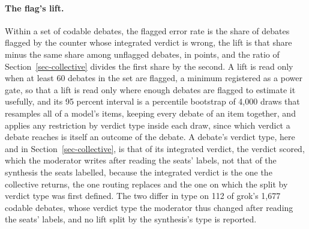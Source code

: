 \paragraph{The flag's lift.}
Within a set of codable debates, the flagged error rate is the share of
debates flagged by the counter whose integrated verdict is wrong, the lift is
that share minus the same share among unflagged debates, in points, and the
ratio of Section~\ref{sec-collective} divides the first share by the second.
A lift is read only when at least 60 debates in the set are flagged, a
minimum registered as a power gate, so that a lift is read only where enough
debates are flagged to estimate it usefully, and its 95 percent interval is a
percentile bootstrap of
4,000 draws that resamples all of a model's items, keeping every debate of an
item together, and applies any restriction by verdict type inside each draw,
since which verdict a debate reaches is itself an outcome of the debate.
A debate's verdict type, here and in Section~\ref{sec-collective}, is that of
its integrated verdict, the verdict scored, which the moderator writes after
reading the seats' labels, not that of the synthesis the seats labelled,
because the integrated verdict is the one the collective returns, the one
routing replaces and the one on which the split by verdict type was first
defined. The two differ in type on 112 of grok's 1,677 codable debates, whose
verdict type the moderator thus changed after reading the seats' labels, and
no lift split by the synthesis's type is reported.
